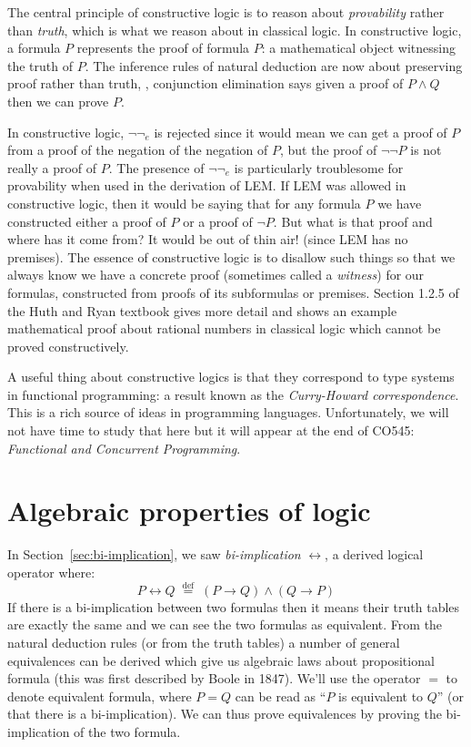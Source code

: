 The central principle of constructive logic is to reason about
\emph{provability} rather than \emph{truth}, which is what
we reason about in classical logic. In
constructive logic, a
formula $P$ represents the proof of formula $P$: a mathematical object
witnessing the truth of $P$. The
inference rules of natural deduction are now about preserving proof
rather than truth, \eg{}, conjunction elimination says given a proof
of $P \wedge Q$ then we can prove $P$.

In constructive logic, $\neg\neg_e$ is rejected since it would mean we
can get a proof of $P$ from a proof of the negation of the negation of
$P$, but the proof of $\neg\neg P$ is not really a proof of $P$. The
presence of $\neg\neg_e$ is particularly troublesome for provability
when used in the derivation of LEM. If LEM was allowed in constructive
logic, then it would be saying that for any formula $P$ we have
constructed either a proof of $P$ or a proof of $\neg P$. But what is
that proof and where has it come from? It would be out of thin air!
(since LEM has no premises). The essence of constructive logic is to disallow such
things so that we always know we have a concrete proof (sometimes
called a \emph{witness}) for our
formulas, constructed from proofs of its subformulas or
premises. Section 1.2.5 of the Huth and Ryan textbook gives more
detail and shows an example mathematical proof about rational numbers
in classical logic which cannot be proved constructively.

A useful thing about constructive logics is that they correspond to
type systems in functional programming: a result known as the
\emph{Curry-Howard correspondence}. This is a rich source
of ideas in programming languages. Unfortunately, we will not have
time to study that here but it will appear at the end of CO545:
\emph{Functional and Concurrent Programming}.

\section{Algebraic properties of logic}
\label{sec:algebraic}

In Section~\ref{sec:bi-implication}, we saw \emph{bi-implication}
$\leftrightarrow$, a derived logical operator where:
%
\begin{equation*}
P \leftrightarrow Q \; \stackrel{\text{def}}{=} \; (P \rightarrow Q) \wedge (Q \rightarrow P)
\end{equation*}
%
If there is a bi-implication between two formulas then it means their
truth tables are exactly the same and we can see the two formulas as
equivalent. From the natural deduction rules (or from the truth
tables) a number of general equivalences can be derived which give
us algebraic laws about propositional formula
(this was first described by Boole in 1847). We'll use the operator
$=$ to denote equivalent formula, where $P = Q$ can be
read as ``$P$ is equivalent to $Q$'' (or that there is a
bi-implication). We can thus prove equivalences by proving the
bi-implication of the two formula.

